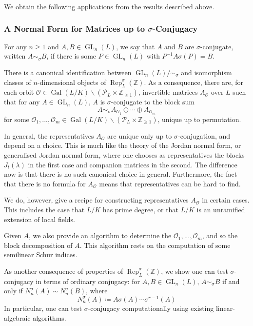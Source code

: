 \documentclass[10pt, reqno, hidelinks]{amsart}
\newcommand{\OO}{\mathcal{O}}
\DeclareMathOperator{\Gal}{Gal}
\DeclareMathOperator{\Rep}{Rep}
\DeclareMathOperator{\GL}{GL}
\newcommand{\bZ}{{\mathbb Z}}
\newcommand{\sP}{{\mathcal P}}
\numberwithin{thm}{subsection}
\theoremstyle{definition}
\begin{document}
We obtain the following applications from the results described above.

\subsubsection*{A Normal Form for Matrices up to $\sigma$-Conjugacy}

For any $n \geq 1$ and $A, B \in \GL_n(L)$, we say that $A$ and $B$ are $\sigma$-conjugate, written $A \sim_{\sigma} B$, if there is some $P \in \GL_n(L)$ with $P^{-1} A \sigma(P) = B$.

There is a canonical identification between $\GL_n(L) / \sim_{\sigma}$ and isomorphism classes of $n$-dimensional objects of $\Rep_L^{\sigma}(\bZ)$. As a consequence, there are, for each orbit $\OO \in \Gal(L/K) \backslash (\sP_L \times \bZ_{\geq 1})$, invertible matrices $A_{\OO}$ over $L$ such that for any $A \in \GL_n(L)$, $A$ is $\sigma$-conjugate to the block sum
\[
A \sim_{\sigma} A_{\OO_1} \oplus \cdots \oplus A_{\OO_m}
\]
for some $\OO_1, ... , \OO_m \in \Gal(L/K) \backslash (\sP_L \times \bZ_{\geq 1})$, unique up to permutation.

In general, the representatives $A_{\OO}$ are unique only up to $\sigma$-conjugation, and depend on a choice. This is much like the theory of the Jordan normal form, or generalised Jordan normal form, where one chooses as representatives the blocks $J_t(\lambda)$ in the first case and companion matrices in the second. The difference now is that there is no such canonical choice in general. Furthermore, the fact that there is no formula for $A_{\OO}$ means that representatives can be hard to find. 

We do, however, give a recipe for constructing representatives $A_{\OO}$ in certain cases. This includes the case that $L/K$ has prime degree, or that $L/K$ is an unramified extension of local fields.

Given $A$, we also provide an algorithm to determine the $\OO_1, ... , \OO_m$, and so the block decomposition of $A$. This algorithm rests on the computation of some semilinear Schur indices.

As another consequence of properties of $\Rep_L^{\sigma}(\bZ)$, we show one can test $\sigma$-conjugacy in terms of ordinary conjugacy: for $A, B \in \GL_n(L)$, $A \sim_{\sigma} B$ if and only if $N_n^{\sigma}(A) \sim N_n^{\sigma}(B)$, where 
\[
N_n^{\sigma}(A) \coloneqq A \sigma(A) \cdots \sigma^{r-1}(A)
\]
In particular, one can test $\sigma$-conjugacy computationally using existing linear-algebraic algorithms.
\end{document}
